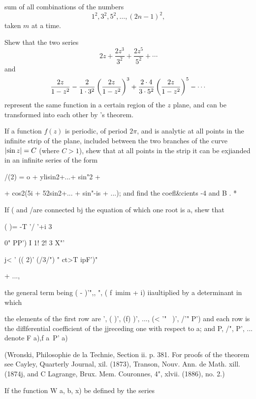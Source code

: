 \begin{wandwmiscexamples}
\begin{wandwmiscexample}
    sum of all combinations of the numbers
    $$
    1^{2}, 3^{2}, 5^{2}, \ldots, (2n-1)^{2},
    $$
    taken $m$ at a time.
  \end{wandwmiscexample}
  \begin{wandwmiscexample}
    Shew that the two series
    $$
    2z
    + \frac{2 z^{3}}{3^{2}}
    + \frac{2 z^{5}}{5^{2}}
    + \cdots
    $$
    and
    $$
    \frac{2z}{1 - z^{2}}
    -
    \frac{2}{1 \cdot 3^{2}}
    \left( 
      \frac{2z}{1 - z^{2}}
     \right)^{3}
    +
    \frac{2 \cdot 4}{3 \cdot 5^{2}}
    \left( 
      \frac{2z}{1 - z^{2}}
     \right)^{5}
    -
    \cdots
    $$
    represent the same function in a certain region of the $z$ plane,
    and can be transformed into each other by \Burmann's theorem.

  \end{wandwmiscexample}
  \begin{wandwmiscexample}
    If a function $f(z)$ is periodic, of period $2 \pi$, and is
    analytic at all points in the infinite strip of the plane,
    included between the two branches of the curve
    $\left| \sin z \right| = C$ (where $C > 1$),
    shew that at all points in the strip it can be exjianded in
    an infinite series of the form

    /(2) = o + ylisin2+...+ sin"2 +

    + cos2(5i + 52sin2+... + sin"-is + ...); and find the coefl\&cients
    -4 and B . *
  \end{wandwmiscexample}
  \begin{wandwmiscexample}
    If ( and /are connected bj the equation of which one root is a,
    shew that

    ( )= -T '/ '+i 3

    0" PP') I 1! 2! 3 X"'

    j< ' (( 2)' (/3/") " ct>T ipF')"

    + ...,

    the general term being ( - )'",, ", ( f\ imim + i) iiaultiplied by a
    determinant in which

    the elements of the first row are ', ( )', (f) )', ..., (< '"~ )', /'"
    P') and each row is the diflferential coefficient of the jjreceding
    one with respect to a; and P, /", P', ... denote F a),f a\ P' a)

    (Wronski, Philosophie de la Technie, Section ii. p. 381. For proofs of
    the theorem see Cayley, Quarterly Journal, xil. (1873), Transon, Nouv.
    Ann. de Math. xill. (1874j, and C Lagrange, Brux. Mem. Couronnes, 4",
    xlvii. (1886), no. 2.)
  \end{wandwmiscexample}
  \begin{wandwmiscexample}
    If the function W a, b, x) be defined by the series


\end{wandwmiscexample}
\end{wandwmiscexamples}
